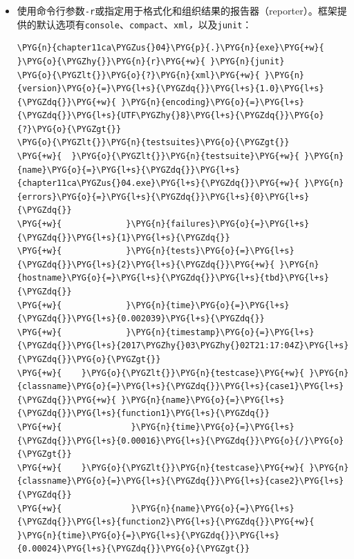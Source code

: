 \begin{itemize}
\item 使用命令行参数\texttt{-\allowbreak{}r}或指定用于格式化和组织结果的报告器（reporter）。框架提供的默认选项有\texttt{console}、\texttt{compact}、\texttt{xml}\textit{，}以及\texttt{junit}：



\begin{codeblockbg}
\begin{Verbatim}[commandchars=\\\{\},breaklines=true,breakanywhere=true,fontsize=\codefont,xleftmargin=17bp]
\PYG{n}{chapter11ca\PYGZus{}04}\PYG{p}{.}\PYG{n}{exe}\PYG{+w}{ }\PYG{o}{\PYGZhy{}}\PYG{n}{r}\PYG{+w}{ }\PYG{n}{junit}
\PYG{o}{\PYGZlt{}}\PYG{o}{?}\PYG{n}{xml}\PYG{+w}{ }\PYG{n}{version}\PYG{o}{=}\PYG{l+s}{\PYGZdq{}}\PYG{l+s}{1.0}\PYG{l+s}{\PYGZdq{}}\PYG{+w}{ }\PYG{n}{encoding}\PYG{o}{=}\PYG{l+s}{\PYGZdq{}}\PYG{l+s}{UTF\PYGZhy{}8}\PYG{l+s}{\PYGZdq{}}\PYG{o}{?}\PYG{o}{\PYGZgt{}}
\PYG{o}{\PYGZlt{}}\PYG{n}{testsuites}\PYG{o}{\PYGZgt{}}
\PYG{+w}{  }\PYG{o}{\PYGZlt{}}\PYG{n}{testsuite}\PYG{+w}{ }\PYG{n}{name}\PYG{o}{=}\PYG{l+s}{\PYGZdq{}}\PYG{l+s}{chapter11ca\PYGZus{}04.exe}\PYG{l+s}{\PYGZdq{}}\PYG{+w}{ }\PYG{n}{errors}\PYG{o}{=}\PYG{l+s}{\PYGZdq{}}\PYG{l+s}{0}\PYG{l+s}{\PYGZdq{}}
\PYG{+w}{             }\PYG{n}{failures}\PYG{o}{=}\PYG{l+s}{\PYGZdq{}}\PYG{l+s}{1}\PYG{l+s}{\PYGZdq{}}
\PYG{+w}{             }\PYG{n}{tests}\PYG{o}{=}\PYG{l+s}{\PYGZdq{}}\PYG{l+s}{2}\PYG{l+s}{\PYGZdq{}}\PYG{+w}{ }\PYG{n}{hostname}\PYG{o}{=}\PYG{l+s}{\PYGZdq{}}\PYG{l+s}{tbd}\PYG{l+s}{\PYGZdq{}}
\PYG{+w}{             }\PYG{n}{time}\PYG{o}{=}\PYG{l+s}{\PYGZdq{}}\PYG{l+s}{0.002039}\PYG{l+s}{\PYGZdq{}}
\PYG{+w}{             }\PYG{n}{timestamp}\PYG{o}{=}\PYG{l+s}{\PYGZdq{}}\PYG{l+s}{2017\PYGZhy{}03\PYGZhy{}02T21:17:04Z}\PYG{l+s}{\PYGZdq{}}\PYG{o}{\PYGZgt{}}
\PYG{+w}{    }\PYG{o}{\PYGZlt{}}\PYG{n}{testcase}\PYG{+w}{ }\PYG{n}{classname}\PYG{o}{=}\PYG{l+s}{\PYGZdq{}}\PYG{l+s}{case1}\PYG{l+s}{\PYGZdq{}}\PYG{+w}{ }\PYG{n}{name}\PYG{o}{=}\PYG{l+s}{\PYGZdq{}}\PYG{l+s}{function1}\PYG{l+s}{\PYGZdq{}}
\PYG{+w}{              }\PYG{n}{time}\PYG{o}{=}\PYG{l+s}{\PYGZdq{}}\PYG{l+s}{0.00016}\PYG{l+s}{\PYGZdq{}}\PYG{o}{/}\PYG{o}{\PYGZgt{}}
\PYG{+w}{    }\PYG{o}{\PYGZlt{}}\PYG{n}{testcase}\PYG{+w}{ }\PYG{n}{classname}\PYG{o}{=}\PYG{l+s}{\PYGZdq{}}\PYG{l+s}{case2}\PYG{l+s}{\PYGZdq{}}
\PYG{+w}{              }\PYG{n}{name}\PYG{o}{=}\PYG{l+s}{\PYGZdq{}}\PYG{l+s}{function2}\PYG{l+s}{\PYGZdq{}}\PYG{+w}{ }\PYG{n}{time}\PYG{o}{=}\PYG{l+s}{\PYGZdq{}}\PYG{l+s}{0.00024}\PYG{l+s}{\PYGZdq{}}\PYG{o}{\PYGZgt{}}

\end{Verbatim}
\end{codeblockbg}
\end{itemize}

